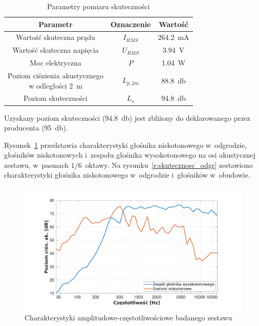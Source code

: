\documentclass[12pt]{oska}
\begin{document}
	\begin{table}[!ht]
		\centering
		\caption{Parametry pomiaru skuteczności}
		\label{t:skutecznosc}
		\begin{tabular}{|c|c|c|}
			\hline
			\textbf{Parametr} & \textbf{Oznaczenie} & \textbf{Wartość} \\\hline
			Wartość skuteczna prądu & $I_{RMS}$ & \SI{264,2}{\milli\ampere} \\\hline
			Wartość skuteczna napięcia & $U_{RMS}$ & \SI{3,94}{\volt} \\\hline
			Moc elektryczna & $P$ & \SI{1,04}{\watt} \\\hline
			\makecell{Poziom ciśnienia akustycznego\\w odległości \SI{2}{\metre}} & $L_{p,2m}$ & \SI{88,8}{\decibel} \\\hline
			Poziom skuteczności & $L_{s}$ & \SI{94,8}{\decibel} \\\hline
		\end{tabular}
	\end{table}
	
	Uzyskany poziom skuteczności (\SI{94,8}{\decibel}) jest zbliżony do deklarowanego przez producenta (\SI{95}{\decibel}).
	
	Rysunek~\ref{r:skutecznosc} przedstawia charakterystyki głośnika niskotonowego w~odgrodzie, głośników niskotonowych i~zespołu głośnika wysokotonowego na osi akustycznej zestawu, w~pasmach $1/6$~oktawy. Na rysunku~\ref{r:skutecznosc_odgr} zestawiono charakterystyki głośnika niskotonowego w~odgrodzie i~głośników w~obudowie.
	
	\begin{figure}[!ht]
		\centering
		\includegraphics[width=.8\textwidth,trim={2cm .5cm 2cm 1cm},clip]{stolik_skutecznosci.pdf}
		\caption{Charakterystyki amplitudowe-częstotliwościowe badanego zestawu}
		\label{r:skutecznosc}
	\end{figure}
	
\end{document}
